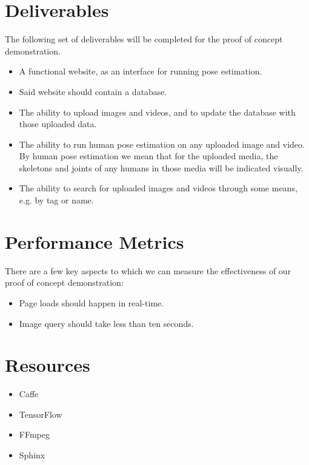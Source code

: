 \documentclass[a4paper, 12pt]{article}
\begin{document}
\section{Deliverables}
{
The following set of deliverables will be completed for the proof of concept
demonstration.

\begin{itemize}
        \item A functional website, as an interface for running pose estimation.
        \item Said website should contain a database.
        \item The ability to upload images and videos, and to update the
                database with those uploaded data.
        \item The ability to run human pose estimation on any uploaded image
                and video. By human pose estimation we mean that for the
                uploaded media, the skeletons and joints of any humans in those
                media will be indicated visually.
        \item The ability to search for uploaded images and videos through some
                means, e.g. by tag or name.
\end{itemize}
}

\section{Performance Metrics}
There are a few key aspects to which we can measure the effectiveness of our
proof of concept demonstration:

\begin{itemize}
        \item Page loads should happen in real-time.
        \item Image query should take less than ten seconds.
\end{itemize}

\section{Resources}
\begin{itemize}
    \item Caffe
    \item TensorFlow
    \item FFmpeg
    \item Sphinx 
\end{itemize}
\end{document}
